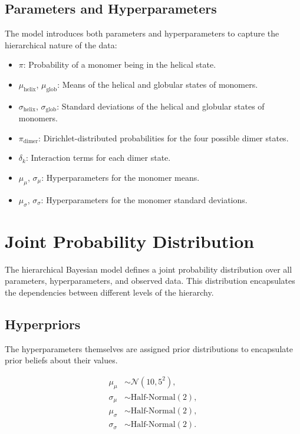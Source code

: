 \documentclass[12pt]{article}
\begin{document}
\subsection{Parameters and Hyperparameters}
The model introduces both parameters and hyperparameters to capture the hierarchical nature of the data:

\begin{itemize}
    \item \(\pi\): Probability of a monomer being in the helical state.
    \item \(\mu_{\text{helix}}\), \(\mu_{\text{glob}}\): Means of the helical and globular states of monomers.
    \item \(\sigma_{\text{helix}}\), \(\sigma_{\text{glob}}\): Standard deviations of the helical and globular states of monomers.
    \item \(\pi_{\text{dimer}}\): Dirichlet-distributed probabilities for the four possible dimer states.
    \item \(\delta_k\): Interaction terms for each dimer state.
    \item \(\mu_{\mu}\), \(\sigma_{\mu}\): Hyperparameters for the monomer means.
    \item \(\mu_{\sigma}\), \(\sigma_{\sigma}\): Hyperparameters for the monomer standard deviations.
\end{itemize}

\section{Joint Probability Distribution}

The hierarchical Bayesian model defines a joint probability distribution over all parameters, hyperparameters, and observed data. This distribution encapsulates the dependencies between different levels of the hierarchy.

\subsection{Hyperpriors}
The hyperparameters themselves are assigned prior distributions to encapsulate prior beliefs about their values.

\begin{align}
    \mu_{\mu} &\sim \mathcal{N}(10, 5^2), \\
    \sigma_{\mu} &\sim \text{Half-Normal}(2), \\
    \mu_{\sigma} &\sim \text{Half-Normal}(2), \\
    \sigma_{\sigma} &\sim \text{Half-Normal}(2).
\end{align}
\end{document}
